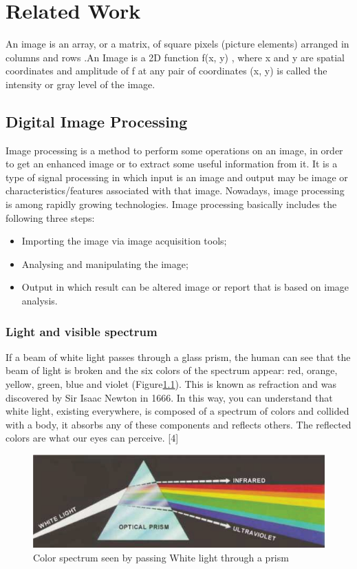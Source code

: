 \chapter{Related Work}
An image is an array, or a matrix, of square pixels (picture elements) arranged in columns and rows .An Image is a 2D function f(x, y) , where x and y are spatial coordinates and amplitude of f at any pair of coordinates (x, y) is called the intensity or gray level of the image.

\section{Digital Image Processing}
Image processing is a method to perform some operations on an image, in order to get an enhanced image or to extract some useful information from it. It is a type of signal processing in which input is an image and output may be image or characteristics/features associated with that image. Nowadays, image processing is among rapidly growing technologies.
Image processing basically includes the following three steps:
\begin{itemize}
	\item Importing the image via image acquisition tools;
	\item Analysing and manipulating the image;
	\item Output in which result can be altered image or report that is based on image analysis.  
\end{itemize}

\subsection{Light and visible spectrum}
If a beam of white light passes through a glass prism, the human can see that the beam of light is broken and the six colors of the spectrum appear: red, orange, yellow, green, blue and violet (Figure\ref{fig:colorSpectrum}). This is known as refraction and was discovered by Sir Isaac Newton in 1666. In this way, you can understand that white light, existing everywhere, is composed of a spectrum of colors and collided with a body, it absorbs any of these components and reflects others. The reflected colors are what our eyes can perceive. [4]
\begin{figure}
  \includegraphics[width=\linewidth]{images/ch2/colorSpectrum.jpg}
  \caption{Color spectrum seen by passing White light through a prism}
  \label{fig:colorSpectrum}
\end{figure}

